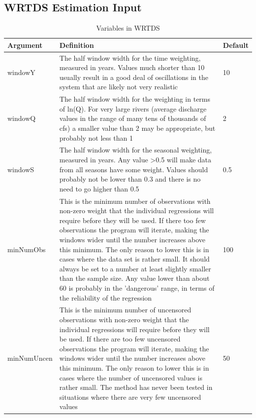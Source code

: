 \documentclass[a4paper,11pt]{article}
\begin{document}
\subsection{WRTDS Estimation Input}
\label{sec:wrtdsInputVariables}
\begin{table}[ht]
\caption{Variables in WRTDS  \label{tab:WRTDS}}
\begin{tabularx}{\textwidth}{lXl}
\hline
  \textbf{Argument} & \textbf{Definition} & \textbf{Default} \\
\hline
windowY & The half window width for the time weighting, measured in years.  Values much shorter than 10 usually result in a good deal of oscillations in the system that are likely not very realistic & 10\\
windowQ & The half window width for the weighting in terms of ln(Q).  For very large rivers (average discharge values in the range of many tens of thousands of cfs) a smaller value than 2 may be appropriate, but probably not less than 1 & 2 \\
windowS & The half window width for the seasonal weighting, measured in years.  Any value >0.5 will make data from all seasons have some weight.  Values should probably not be lower than 0.3 and there is no need to go higher than 0.5 & 0.5 \\
minNumObs & This is the minimum number of observations with non-zero weight that the individual regressions will require before they will be used.  If there too few observations the program will iterate, making the windows wider until the number increases above this minimum.  The only reason to lower this is in cases where the data set is rather small.  It should always be set to a number at least slightly smaller than the sample size.  Any value lower than about 60 is probably in the 'dangerous' range, in terms of the reliability of the regression & 100 \\ 
minNumUncen & This is the minimum number of uncensored observations with non-zero weight that the individual regressions will require before they will be used.  If there are too few uncensored observations the program will iterate, making the windows wider until the number increases above this minimum.  The only reason to lower this is in cases where the number of uncensored values is rather small.  The method has never been tested in situations where there are very few uncensored values & 50 \\
\hline
\end{tabularx}

\end{table}
\end{document}
